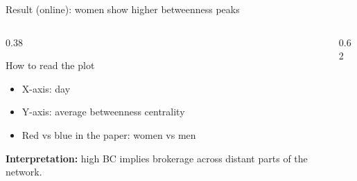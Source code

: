\begin{frame}{Result (online): women show higher betweenness peaks}
  \small
  \begin{columns}[T,onlytextwidth]
    \begin{column}{0.38\textwidth}
      \begin{block}{How to read the plot}
        \begin{itemize}
          \item X-axis: day
          \item Y-axis: average betweenness centrality
          \item Red vs blue in the paper: women vs men
        \end{itemize}
      \end{block}

      {\color{PresTwoSecondary}\textbf{Interpretation:}}
      high BC implies brokerage across distant parts of the network.
    \end{column}

    \begin{column}{0.62\textwidth}
    \end{column}
  \end{columns}

\end{frame}

